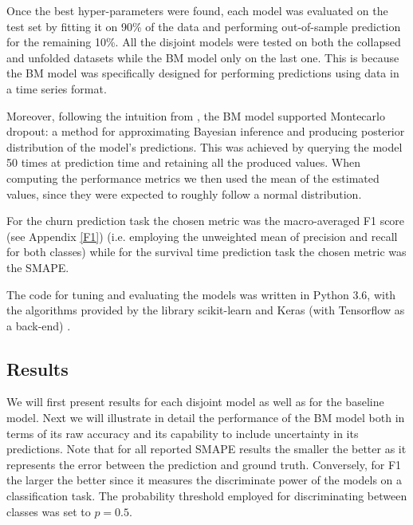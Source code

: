 Once the best hyper-parameters were found, each model was evaluated on the test set by fitting it on 90\% of the data and performing out-of-sample prediction for the remaining 10\%. All the disjoint models were tested on both the collapsed and unfolded datasets while the BM model only on the last one. This is because the BM model was specifically designed for performing predictions using data in a time series format. 

Moreover, following the intuition from \cite{gal2016dropout}, the BM model supported Montecarlo dropout: a method for approximating Bayesian inference and producing posterior distribution of the model's predictions. This was achieved by querying the model 50 times at prediction time and retaining all the produced values. When computing the performance metrics we then used the mean of the estimated values, since they were expected to roughly follow a normal distribution. 

For the churn prediction task the chosen metric was the macro-averaged F1 score (see Appendix \ref{F1}) (i.e. employing the unweighted mean of precision and recall for both classes) while for the survival time prediction task the chosen metric was the SMAPE. 

The code for tuning and evaluating the models was written in Python 3.6, with the algorithms provided by the library scikit-learn \cite{scikit-learn} and  Keras (with Tensorflow as a back-end) \cite{chollet2015keras}.

\subsection{Results}
\label{results_1}
We will first present results for each disjoint model as well as for the baseline model. Next we will illustrate in detail the performance of the BM model both in terms of its raw accuracy and its capability to include uncertainty in its predictions. Note that for all reported SMAPE results the smaller the better as it represents the error between the prediction and ground truth. Conversely, for F1 the larger the better since it measures the discriminate power of the models on a classification task. The probability threshold employed for discriminating between classes was set to $p=0.5$. 

